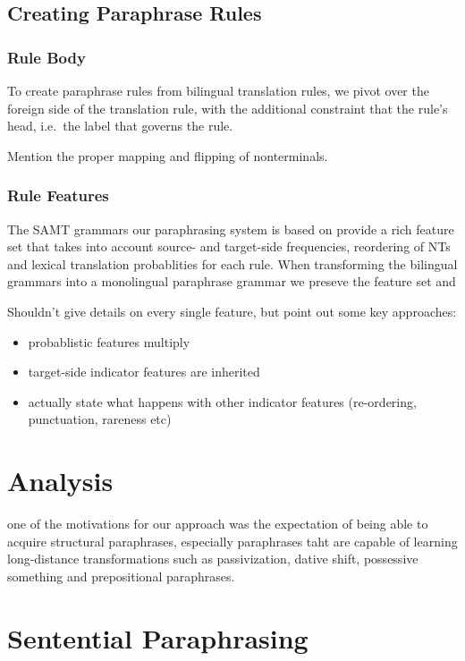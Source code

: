 \documentclass[11pt]{article}
\begin{document}
\subsection{Creating Paraphrase Rules} \label{rule_creation}

\subsubsection{Rule Body} \label{rule_body}

To create paraphrase rules from bilingual translation rules, we pivot
over the foreign side of the translation rule, with the additional
constraint that the rule's head, i.e.\ the label that governs the
rule.

Mention the proper mapping and flipping of nonterminals.

\subsubsection{Rule Features} \label{rule_features}

The SAMT grammars our paraphrasing system is based on provide a rich
feature set that takes into account source- and target-side
frequencies, reordering of NTs and lexical translation probablities
for each rule. When transforming the bilingual grammars into a
monolingual paraphrase grammar we preseve the feature set and

Shouldn't give details on every single feature, but point out some key
approaches:
\begin{itemize}
\item probablistic features multiply 
\item target-side indicator features are inherited
\item actually state what happens with other indicator features
  (re-ordering, punctuation, rareness etc)
\end{itemize}


\section{Analysis} \label{analysis}

one of the motivations for our approach was the expectation of being
able to acquire structural paraphrases, especially paraphrases taht
are capable of learning long-distance transformations such as
passivization, dative shift, possessive something and prepositional
paraphrases.

\section{Sentential Paraphrasing} \label{sentential_paraphrasing}
\end{document}
